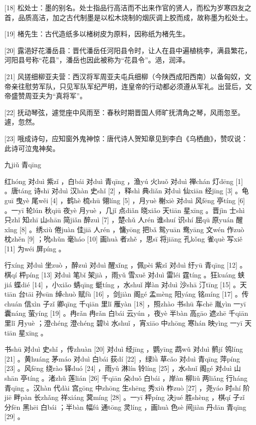 \documentclass[12pt,UTF8]{ctexbook}
\begin{document}
[18] 松处士：墨的别名。处士指品行高洁而不出来作官的贤人，而松为岁寒四友之首，品质高洁，加之古代制墨是以松木烧制的烟灰调上胶而成，故称墨为松处士。

[19] 楮先生：古代造纸多以楮树皮为原料，因称纸为楮先生。

[20] 露浥好花潘岳县：晋代潘岳任河阳县令时，让人在县中遍植桃李，满县繁花，河阳县号称“花县”，潘岳也因此被称为“花县令”。浥，润泽。

[21] 风搓细柳亚夫营：西汉将军周亚夫屯兵细柳（今陕西成阳西南）以备匈奴，文帝亲往慰劳军队，只见军队军纪严明，连皇帝的行动都必须遵从军礼。出营后，文帝盛赞周亚夫为“真将军”。

[22] 抚动琴弦，遽觉座中风雨至：春秋时期晋国人师旷抚清角之琴，风雨忽至。遽，忽然。

[23] 哦成诗句，应知窗外鬼神惊：唐代诗人贺知章见到李白《乌栖曲》，赞叹说：此诗可泣鬼神矣。





九jiǔ 青qīng


红hóng 对duì 紫zǐ ，白bái 对duì 青qīng ，渔yú 火huǒ 对duì 禅chán 灯dēng [1] 。唐táng 诗shī 对duì 汉hàn 史shǐ [2] ，释shì 典diǎn 对duì 仙xiān 经jīng [3] 。龟guī 曳yè 尾wěi [4] ，鹤hè 梳shū 翎líng [5] ，月yuè 榭xiè 对duì 风fēng 亭tíng [6] 。一yī 轮lún 秋qiū 夜yè 月yuè ，几jǐ 点diǎn 晓xiǎo 天tiān 星xīng 。晋jìn 士shì 只zhǐ 知zhī 山shān 简jiǎn 醉zuì [7] ，楚chǔ 人rén 谁shuí 识shí 屈qū 原yuán 醒xǐng [8] 。绣xiù 倦juàn 佳jiā 人rén ，慵yōng 把bǎ 鸳yuān 鸯yāng 文wén 作zuò 枕zhěn [9] ；吮shǔn 毫háo [10] 画huà 者zhě ，思sī 将jiāng 孔kǒng 雀què 写xiě [11] 为wéi 屏píng 。

行xíng 对duì 坐zuò ，醉zuì 对duì 醒xǐng ，佩pèi 紫zǐ 对duì 纡yū 青qīng [12] 。棋qí 枰píng [13] 对duì 笔bǐ 架jià ，雨yǔ 雪xuě 对duì 雷léi 霆tíng 。狂kuáng 蛱jiá 蝶dié [14] ，小xiǎo 蜻qīng 蜓tíng ，水shuǐ 岸àn 对duì 沙shā 汀tīng [15] 。天tiān 台tāi 孙sūn 绰chuò 赋fù [16] ，剑jiàn 阁gé 孟mèng 阳yáng 铭míng [17] 。传chuán 信xìn 子zǐ 卿qīng 千qiān 里lǐ 雁yàn [18] ，照zhào 书shū 车chē 胤yìn 一yī 囊náng 萤yíng [19] 。冉rǎn 冉rǎn 白bái 云yún ，夜yè 半bàn 高gāo 遮zhē 千qiān 里lǐ 月yuè ；澄chéng 澄chéng 碧bì 水shuǐ ，宵xiāo 中zhōng 寒hán 映yìng 一yī 天tiān 星xīng 。

书shū 对duì 史shǐ ，传zhuàn [20] 对duì 经jīng ，鹦yīng 鹉wǔ 对duì 鹡jí 鸰líng [21] 。黄huáng 茅máo 对duì 白bái 荻dí [22] ，绿lǜ 草cǎo 对duì 青qīng 萍píng [23] 。风fēng 绕rào 铎duó [24] ，雨yǔ 淋lín 铃líng [25] ，水shuǐ 阁gé 对duì 山shān 亭tíng 。渚zhǔ 莲lián [26] 千qiān 朵duǒ 白bái ，岸àn 柳liǔ 两liǎng 行háng 青qīng 。汉hàn 代dài 宫gōng 中zhōng 生shēng 秀xiù 柞zuò [27] ，尧yáo 时shí 阶jiē 畔pàn 长zhǎng 祥xiáng 蓂míng [28] 。一yī 枰píng 决jué 胜shèng ，棋qí 子zǐ 分fēn 黑hēi 白bái ；半bàn 幅fú 通tōng 灵líng ，画huà 色sè 间jiàn 丹dān 青qīng [29] 。
\end{document}
